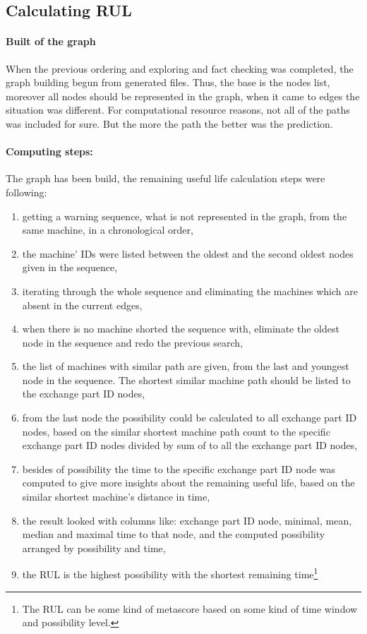 	\subsection{Calculating RUL}
			\paragraph{Built of the graph}
			When the previous ordering and exploring and fact checking was completed, the graph building begun from generated files. Thus, the base is the nodes list, moreover all nodes should be represented in the graph, when it came to edges the situation was different. For computational resource reasons, not all of the paths was included for sure. But the more the path the better was the prediction.
			\paragraph{Computing steps:}
			The graph has been build, the remaining useful life calculation steps were following:
			\begin{enumerate}
				\item{getting a warning sequence, what is not represented in the graph, from the same machine, in a chronological order,}
				\item{the machine' IDs were listed between the oldest and the second oldest nodes given in the sequence,}
				\item{iterating through the whole sequence and eliminating the machines which are absent in the current edges,}
				\item{when there is no machine shorted the sequence with, eliminate the oldest node in the sequence and redo the previous search,}
				\item{the list of machines with similar path are given, from the last and youngest node in the sequence. The shortest similar machine path should be listed to the exchange part ID nodes,}
				\item{from the last node the possibility could be calculated to all exchange part ID nodes, based on the similar shortest machine path count to the specific exchange part ID nodes divided by sum of to all the exchange part ID nodes,}
				\item{besides of possibility the time to the specific exchange part ID node was computed to give more insights about the remaining useful life, based on the similar shortest machine's distance in time,}
				\item{the result looked with columns like: exchange part ID node, minimal, mean, median and maximal time to that node, and the computed possibility arranged by possibility and time,} 
		 		\item{the RUL is the highest possibility with the shortest remaining time}\footnote{The RUL can be some kind of metascore based on some kind of time window and possibility level.}
		 	\end{enumerate}
